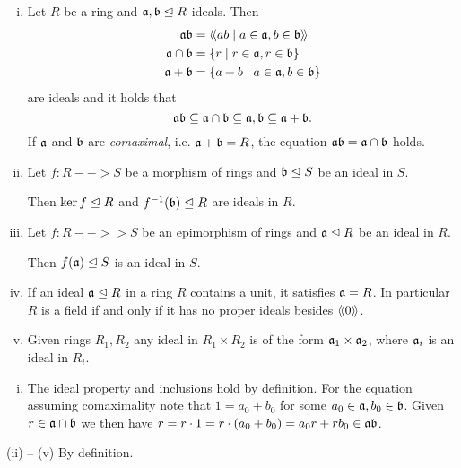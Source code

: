 	\begin{lemma}
		\vspace{-1.5em}\begin{enumerate}[(i)]
			\item{
				Let $R$ be a ring and $\mathfrak{a},\mathfrak{b} \trianglelefteq R$ ideals. Then
				\begin{align*}
					\mathfrak{ab} &= \langle\!\langle ab \mid a \in \mathfrak{a}, b \in \mathfrak{b} \rangle\!\rangle\\
					\mathfrak{a} \cap \mathfrak{b} &= \{r \mid r \in \mathfrak{a}, r \in \mathfrak{b}\}\\
					\mathfrak{a} + \mathfrak{b} &= \{a + b \mid a \in \mathfrak{a}, b \in \mathfrak{b}\}
				\end{align*}
				are ideals and it holds that 
				\begin{equation*}
					\mathfrak{ab} \subseteq \mathfrak{a} \cap \mathfrak{b} \subseteq \mathfrak{a}, \mathfrak{b} \subseteq \mathfrak{a} + \mathfrak{b}.
				\end{equation*}
				If $\mathfrak{a}$ and $\mathfrak{b}$ are \textit{comaximal}, i.e. $\mathfrak{a} + \mathfrak{b} = R$, the equation $\mathfrak{ab} = \mathfrak{a} \cap \mathfrak{b}$ holds.
			}
			\item{
				Let $f:R --> S$ be a morphism of rings and $\mathfrak{b} \trianglelefteq S$ be an ideal in $S$.

				Then $\ker f \trianglelefteq R$ and $f^{-1}(\mathfrak{b}) \trianglelefteq R$ are ideals in $R$.
			}
			\item{
				Let $f:R -->> S$ be an epimorphism of rings and $\mathfrak{a} \trianglelefteq R$ be an ideal in $R$.

				Then $f(\mathfrak{a}) \trianglelefteq S$ is an ideal in $S$.
			}
			\item{
				If an ideal $\mathfrak{a} \trianglelefteq R$ in a ring $R$ contains a unit, it satisfies $\mathfrak{a}=R$. In particular $R$ is a field if and only if it has no proper ideals besides $\langle\!\langle 0 \rangle\!\rangle$.
			}
			\item{
				Given rings $R_1,R_2$ any ideal in $R_1 \times R_2$ is of the form $\mathfrak{a}_1 \times \mathfrak{a}_2$, where $\mathfrak{a}_i$ is an ideal in $R_i$. 
			}
		\end{enumerate}
	\end{lemma}
	\begin{sketch}
		\begin{enumerate}[(i)]
			\item{
				The ideal property and inclusions hold by definition. For the equation assuming comaximality note that $1 = a_0+b_0$ for some $a_0 \in \mathfrak{a}, b_0 \in \mathfrak{b}$. Given $r \in \mathfrak{a}\cap\mathfrak{b}$ we then have $r = r\cdot 1 = r\cdot(a_0+b_0) = a_0r + rb_0 \in \mathfrak{ab}$.
			}
		\end{enumerate}
		\hspace{.15cm}(ii) -- (v) By definition.
	\end{sketch}

